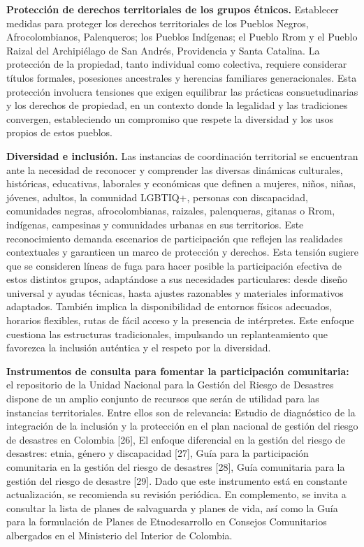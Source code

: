 \documentclass[
  spanish,
  letterpaper,
]{book}
\begin{document}
\begin{tcolorbox}[enhanced jigsaw, rightrule=.15mm, colframe=quarto-callout-important-color-frame, opacityback=0, arc=.35mm, bottomrule=.15mm, toprule=.15mm, breakable, colback=white, leftrule=.75mm, left=2mm]
\textbf{Protección de derechos territoriales de los grupos étnicos.}
Establecer medidas para proteger los derechos territoriales de los
Pueblos Negros, Afrocolombianos, Palenqueros; los Pueblos Indígenas; el
Pueblo Rrom y el Pueblo Raizal del Archipiélago de San Andrés,
Providencia y Santa Catalina. La protección de la propiedad, tanto
individual como colectiva, requiere considerar títulos formales,
posesiones ancestrales y herencias familiares generacionales. Esta
protección involucra tensiones que exigen equilibrar las prácticas
consuetudinarias y los derechos de propiedad, en un contexto donde la
legalidad y las tradiciones convergen, estableciendo un compromiso que
respete la diversidad y los usos propios de estos pueblos.

\end{tcolorbox}

\textbf{Diversidad e inclusión.} Las instancias de coordinación
territorial se encuentran ante la necesidad de reconocer y comprender
las diversas dinámicas culturales, históricas, educativas, laborales y
económicas que definen a mujeres, niños, niñas, jóvenes, adultos, la
comunidad LGBTIQ+, personas con discapacidad, comunidades negras,
afrocolombianas, raizales, palenqueras, gitanas o Rrom, indígenas,
campesinas y comunidades urbanas en sus territorios. Este reconocimiento
demanda escenarios de participación que reflejen las realidades
contextuales y garanticen un marco de protección y derechos. Esta
tensión sugiere que se consideren líneas de fuga para hacer posible la
participación efectiva de estos distintos grupos, adaptándose a sus
necesidades particulares: desde diseño universal y ayudas técnicas,
hasta ajustes razonables y materiales informativos adaptados. También
implica la disponibilidad de entornos físicos adecuados, horarios
flexibles, rutas de fácil acceso y la presencia de intérpretes. Este
enfoque cuestiona las estructuras tradicionales, impulsando un
replanteamiento que favorezca la inclusión auténtica y el respeto por la
diversidad.

\textbf{Instrumentos de consulta para fomentar la participación
comunitaria:} el repositorio de la Unidad Nacional para la Gestión del
Riesgo de Desastres dispone de un amplio conjunto de recursos que serán
de utilidad para las instancias territoriales. Entre ellos son de
relevancia: Estudio de diagnóstico de la integración de la inclusión y
la protección en el plan nacional de gestión del riesgo de desastres en
Colombia {[}26{]}, El enfoque diferencial en la gestión del riesgo de
desastres: etnia, género y discapacidad {[}27{]}, Guía para la
participación comunitaria en la gestión del riesgo de desastres
{[}28{]}, Guía comunitaria para la gestión del riesgo de desastre
{[}29{]}. Dado que este instrumento está en constante actualización, se
recomienda su revisión periódica. En complemento, se invita a consultar
la lista de planes de salvaguarda y planes de vida, así como la Guía
para la formulación de Planes de Etnodesarrollo en Consejos Comunitarios
albergados en el Ministerio del Interior de Colombia.
\end{document}
